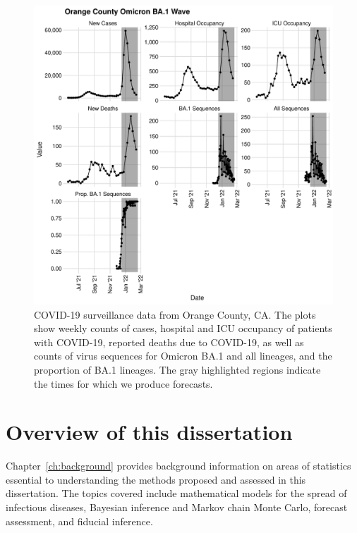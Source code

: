 \begin{figure}
    \centering
    \includegraphics[width=1.0\columnwidth]{figures/ch_5/orange_county_binned_data_plot.pdf}
    \caption[COVID-19 surveillance data from Orange County, California.]{
COVID-19 surveillance data from Orange County, CA.
The plots show weekly counts of cases, hospital and ICU occupancy of patients with COVID-19, reported deaths due to COVID-19, as well as counts of virus sequences for Omicron BA.1 and all lineages, and the proportion of BA.1 lineages.
The gray highlighted regions indicate the times for which we produce forecasts.}
    \label{ch_1:fig:orange_county_binned_data_plot}
\end{figure}

\section{Overview of this dissertation}
Chapter~\ref{ch:background} provides background information on areas of statistics essential to understanding the methods proposed and assessed in this dissertation.
The topics covered include mathematical models for the spread of infectious diseases, Bayesian inference and Markov chain Monte Carlo, forecast assessment, and fiducial inference.

